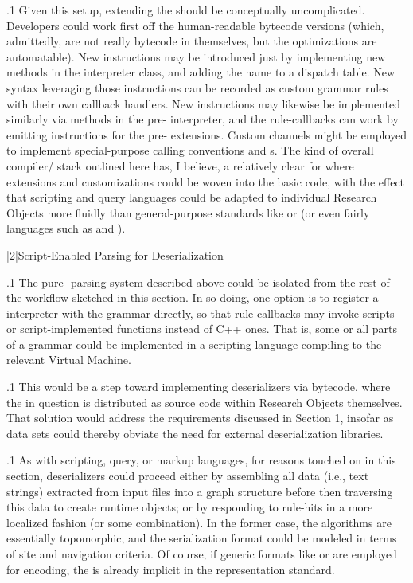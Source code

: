 \documentclass[11pt, twocolumn]{article}
\begin{document}
\p.1{%
Given this setup, extending the  should be conceptually
uncomplicated. Developers could work first off the
human-readable bytecode versions (which, admittedly, are
not really bytecode in themselves, but the optimizations
are automatable). New instructions may be introduced
just by implementing new methods in the interpreter
class, and adding the name to a dispatch table.
New syntax leveraging those instructions can be
recorded as custom grammar rules with their own callback
handlers. New   instructions may
likewise be implemented similarly via methods in the
pre- interpreter, and the rule-callbacks can
work by emitting instructions for the pre- extensions.
Custom channels might be employed to implement
special-purpose calling conventions and s.
The kind of overall compiler/ stack outlined
here has, I believe, a relatively clear  for where
extensions and customizations could be woven into
the basic code, with the effect that scripting
and query languages could be adapted to
individual Research Objects more fluidly
than general-purpose standards like
 or  (or even fairly 
languages such as  and ).
}%


\s|2|{Script-Enabled Parsing for Deserialization}

\p.1{%
The pure- parsing system described above could
be isolated from the rest of the workflow sketched
in this section. In so doing, one option is to
register a  interpreter with the grammar
directly, so that rule callbacks may invoke scripts
or script-implemented functions instead of C++ ones.
That is, some or all parts of a grammar could
be implemented in a scripting language compiling to the
relevant Virtual Machine.
}%

\p.1{%
This would be a step toward implementing deserializers
via  bytecode, where the  in question is
distributed as source code within Research Objects
themselves. That solution would address the requirements
discussed in Section 1, insofar as data sets could
thereby obviate the need for external deserialization libraries.
}%

\p.1{%
As with scripting, query, or markup languages, for reasons touched
on in this section, deserializers could proceed either by
assembling all data (i.e., text strings) extracted from
input files into a graph structure before then traversing this
data to create runtime objects; or by responding to
rule-hits in a more localized fashion (or some combination).
In the former case, the algorithms are essentially
topomorphic, and the serialization format could be
modeled in terms of site and navigation criteria.
Of course, if generic formats like  or
 are employed for encoding, the  is already implicit in the representation standard.
}%
\end{document}
